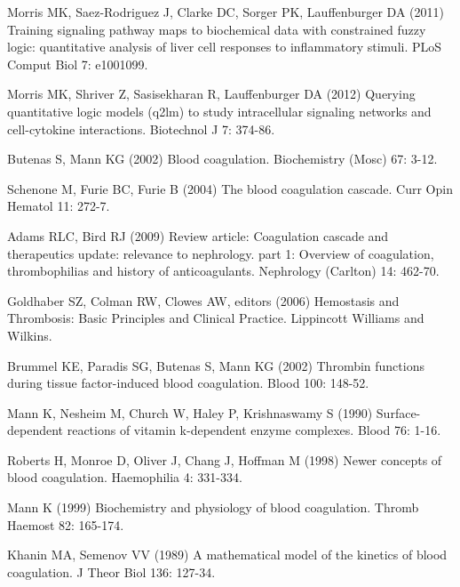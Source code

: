 \documentclass[processes,article,received,moreauthors,pdftex,12pt,a4paper]{mdpi}
\begin{document}
\begin{thebibliography}{9999}
Morris MK, Saez-Rodriguez J, Clarke DC, Sorger PK, Lauffenburger DA (2011)
  Training signaling pathway maps to biochemical data with constrained fuzzy
  logic: quantitative analysis of liver cell responses to inflammatory stimuli.
\newblock PLoS Comput Biol 7: e1001099.

Morris MK, Shriver Z, Sasisekharan R, Lauffenburger DA (2012) Querying
  quantitative logic models (q2lm) to study intracellular signaling networks
  and cell-cytokine interactions.
\newblock Biotechnol J 7: 374-86.

Butenas S, Mann KG (2002) Blood coagulation.
\newblock Biochemistry (Mosc) 67: 3-12.

Schenone M, Furie BC, Furie B (2004) The blood coagulation cascade.
\newblock Curr Opin Hematol 11: 272-7.

Adams RLC, Bird RJ (2009) Review article: Coagulation cascade and therapeutics
  update: relevance to nephrology. part 1: Overview of coagulation,
  thrombophilias and history of anticoagulants.
\newblock Nephrology (Carlton) 14: 462-70.

Goldhaber SZ, Colman RW, Clowes AW, editors (2006) {Hemostasis and Thrombosis:
  Basic Principles and Clinical Practice}.
\newblock Lippincott Williams and Wilkins.

Brummel KE, Paradis SG, Butenas S, Mann KG (2002) Thrombin functions during
  tissue factor-induced blood coagulation.
\newblock Blood 100: 148-52.

Mann K, Nesheim M, Church W, Haley P, Krishnaswamy S (1990) Surface-dependent
  reactions of vitamin k-dependent enzyme complexes.
\newblock Blood 76: 1-16.

Roberts H, Monroe D, Oliver J, Chang J, Hoffman M (1998) Newer concepts of
  blood coagulation.
\newblock Haemophilia 4: 331-334.

Mann K (1999) Biochemistry and physiology of blood coagulation.
\newblock Thromb Haemost 82: 165-174.

Khanin MA, Semenov VV (1989) A mathematical model of the kinetics of blood
  coagulation.
\newblock J Theor Biol 136: 127-34.


\end{thebibliography}
\end{document}
